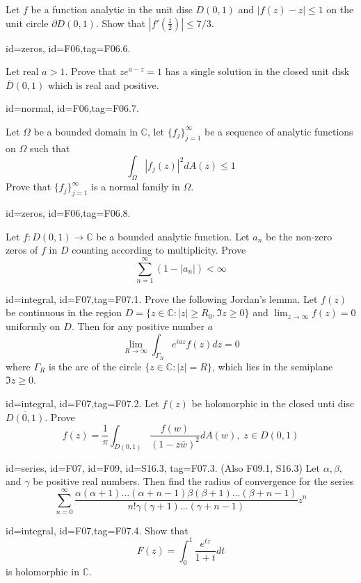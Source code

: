 \documentclass[12pt,letterpaper]{article}
\begin{document}
{Let $f$ be a function analytic in the unit disc $D(0,1)$ and $| f(z) - z | \le 1$ on the unit circle $\partial D(0,1)$. Show that $\left| f'(\frac{1}{2}) \right| \le 7/3$.

\item[id=zeros, id=F06,tag=F06.6.]

Let real $a > 1$. Prove that $ze^{a-z} = 1$ has a single solution in the closed unit disk $\overline{D}(0,1)$ which is real and positive.

\item[id=normal, id=F06,tag=F06.7.]

Let $\Omega$ be a bounded domain in $\mathbb{C}$, let $\{f_j\}_{j=1}^{\infty}$ be a sequence of analytic functions on $\Omega$ such that
\[
	\int_{\Omega} | f_j(z) |^2 dA(z) \le 1
\]
Prove that $\{f_j\}_{j=1}^{\infty}$ is a normal family in $\Omega$.

\item[id=zeros, id=F06,tag=F06.8.]

Let $f : D(0,1) \rightarrow \mathbb{C}$ be a bounded analytic function. Let $a_n$ be the non-zero zeros of $f$ in $D$ counting according to multiplicity. Prove
\[
	\sum_{n=1}^{\infty} (1 - | a_n |) < \infty
\]

\item[id=integral, id=F07,tag=F07.1.]
Prove the following Jordan's lemma. Let $f(z)$ be continuous in the region $D = \{z \in \mathbb{C} \colon | z | \ge R_0, \Im z \ge 0 \}$ and $\lim_{z\rightarrow \infty} f(z) = 0$ uniformly on $D$. Then for any positive number $a$
\[
	\lim_{R\rightarrow \infty} \int_{\Gamma_R} e^{iaz} f(z) dz = 0
\]
where $\Gamma_R$ is the arc of the circle $\{z \in \mathbb{C} \colon | z | = R\}$, which lies in the semiplane $\Im z \ge 0$.

\item[id=integral, id=F07,tag=F07.2.]
Let $f(z)$ be holomorphic in the closed unti disc $\overline{D(0,1)}$. Prove
\[
	f(z) = \frac{1}{\pi} \int_{D(0,1)} \frac{f(w)}{(1-z\overline{w})^2} dA(w), \; z \in D(0,1)
\]

\item[id=series, id=F07, id=F09, id=S16.3, tag=F07.3.] (Also F09.1, S16.3)
Let $\alpha, \beta,$ and $\gamma$ be positive real numbers. Then find the radius of convergence for the series
\[
	\sum_{n=0}^{\infty} \frac{\alpha(\alpha + 1)\ldots(\alpha + n - 1)\beta(\beta + 1)\ldots(\beta + n -1)}{n!\gamma(\gamma+1)\ldots(\gamma + n - 1)} z^n
\]

\item[id=integral, id=F07,tag=F07.4.]
Show that
\[
	F(z) = \int_{0}^{1} \frac{e^{tz}}{1+t} dt
\]
is holomorphic in $\mathbb{C}$.

}
\end{document}
